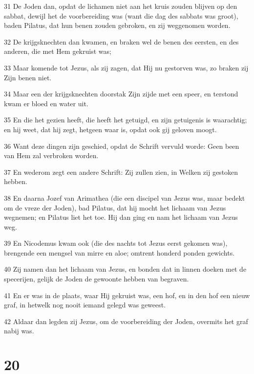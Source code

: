 \par 31 De Joden dan, opdat de lichamen niet aan het kruis zouden blijven op den sabbat, dewijl het de voorbereiding was (want die dag des sabbats was groot), baden Pilatus, dat hun benen zouden gebroken, en zij weggenomen worden.
\par 32 De krijgsknechten dan kwamen, en braken wel de benen des eersten, en des anderen, die met Hem gekruist was;
\par 33 Maar komende tot Jezus, als zij zagen, dat Hij nu gestorven was, zo braken zij Zijn benen niet.
\par 34 Maar een der krijgsknechten doorstak Zijn zijde met een speer, en terstond kwam er bloed en water uit.
\par 35 En die het gezien heeft, die heeft het getuigd, en zijn getuigenis is waarachtig; en hij weet, dat hij zegt, hetgeen waar is, opdat ook gij geloven moogt.
\par 36 Want deze dingen zijn geschied, opdat de Schrift vervuld worde: Geen been van Hem zal verbroken worden.
\par 37 En wederom zegt een andere Schrift: Zij zullen zien, in Welken zij gestoken hebben.
\par 38 En daarna Jozef van Arimathea (die een discipel van Jezus was, maar bedekt om de vreze der Joden), bad Pilatus, dat hij mocht het lichaam van Jezus wegnemen; en Pilatus liet het toe. Hij dan ging en nam het lichaam van Jezus weg.
\par 39 En Nicodemus kwam ook (die des nachts tot Jezus eerst gekomen was), brengende een mengsel van mirre en aloe; omtrent honderd ponden gewichts.
\par 40 Zij namen dan het lichaam van Jezus, en bonden dat in linnen doeken met de specerijen, gelijk de Joden de gewoonte hebben van begraven.
\par 41 En er was in de plaats, waar Hij gekruist was, een hof, en in den hof een nieuw graf, in hetwelk nog nooit iemand gelegd was geweest.
\par 42 Aldaar dan legden zij Jezus, om de voorbereiding der Joden, overmits het graf nabij was.

\chapter{20}

